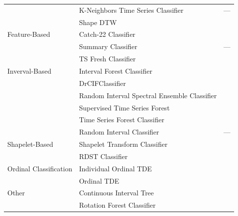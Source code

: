 \documentclass[final,3p,times,twocolumn]{elsarticle}
\begin{document}
\begin{table}[t!]
{\begin{tabular}{llc}
                     & K-Neighbors Time Series Classifier    & ---                \\
                     & Shape DTW                & \cite{ShapeDTW}        \\
         Feature-Based        & Catch-22 Classifier            & \cite{Catch22Classifier}    \\
                     & Summary Classifier            & ---                \\
                     & TS Fresh Classifier            & \cite{TSFreshClassifier}      \\
         Inverval-Based        & Interval Forest Classifier    & \cite{CanonicalIntervalForestClassifier}\\
                     & DrCIFClassifier            & \cite{HIVECOTEV2}        \\
             & Random Interval Spectral Ensemble Classifier & \cite{RandomIntervalSpectralEnsembleClassifier}\\
                     & Supervised Time Series Forest        & \cite{SupervisedTimeSeriesForest}\\
                     & Time Series Forest Classifier        & \cite{TimeSeriesForestClassifier}\\
                     & Random Interval Classifier        & ---                \\
         Shapelet-Based        & Shapelet Transform Classifier        & \cite{ShapeletTransformClassifier-1}\cite{ShapeletTransformClassifier-2}\\
                     & RDST Classifier            & \cite{RDSTClassifier-1}\cite{RDSTClassifier-2}\\
         Ordinal Classification    & Individual Ordinal TDE        & \cite{OrdinalTDE}        \\
                     & Ordinal TDE                & \cite{OrdinalTDE}        \\
         Other            & Continuous Interval Tree        & \cite{ContinuousIntervalTree}    \\
                     & Rotation Forest Classifier        & \cite{RotationForestClassifier}\\
        \bottomrule
    \end{tabular}
    }
    \label{tab:non_cv_list}
\end{table}
\end{document}
